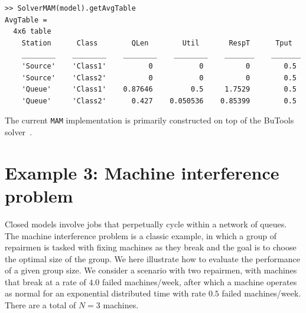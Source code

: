 \begin{lstlisting}
>> SolverMAM(model).getAvgTable
AvgTable =
  4x6 table
    Station      Class        QLen        Util       RespT      Tput
    ________    ________    ________    ________    _______    _______
    'Source'    'Class1'          0           0          0        0.5
    'Source'    'Class2'          0           0          0        0.5
    'Queue'     'Class1'    0.87646         0.5     1.7529        0.5
    'Queue'     'Class2'      0.427    0.050536    0.85399        0.5
\end{lstlisting}
The current \texttt{MAM} implementation is primarily constructed on top of the BuTools solver~\cite{Hor17}.

\section{Example 3: Machine interference problem}
\label{example-3-machine-interference-problem}
Closed models involve jobs that perpetually cycle within a network of queues. The machine interference problem is a classic example, in which a group of repairmen is tasked with fixing machines as they break and the goal is to choose the optimal size of the group. We here illustrate how to evaluate the performance of a given group size. We consider a scenario with two repairmen, with machines that break at a rate of $4.0$ failed machines/week, after which a machine operates as normal for an exponential distributed time with rate $0.5$ failed machines/week. There are a total of $N=3$ machines.

